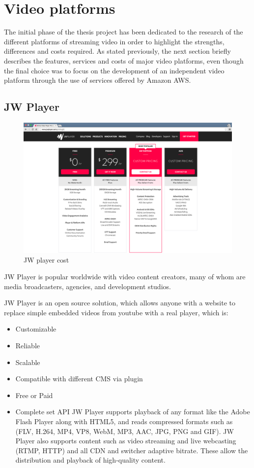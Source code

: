 \section{Video platforms}
\label{sec:Video platforms}

The initial phase of the thesis project has been dedicated to the research of the different platforms of streaming video in order to highlight the strengths, differences and costs required. As stated previously, the next section briefly describes the features, services and costs of major video platforms, even though the final choice was to focus on the development of an independent video platform through the use of services offered by Amazon AWS.
\newpage
\subsection{JW Player}
\label{sec:JW Player}

\begin{figure}[htb]
 \centering
 \includegraphics[width=1.0\linewidth]{images/chapter2/jwtPLayer.png}\hfill
 \caption[JW player cost]{JW player cost}
 \label{fig:fourV}
\end{figure}
JW Player is popular worldwide with video content creators, many of whom are media broadcasters, agencies, and development studios. 

JW Player is an open source solution, which allows anyone with a website to replace simple embedded videos from youtube with a real player, which is:

\begin{itemize}
\item Customizable
\item Reliable
\item Scalable
\item Compatible with different CMS via plugin
\item Free or Paid
\item Complete set API
JW Player supports playback of any format like the Adobe Flash Player along with HTML5, and reads compressed formats such as (FLV, H.264, MP4, VP8, WebM, MP3, AAC, JPG, PNG and GIF). JW Player also  supports content such as video streaming and live webcasting (RTMP, HTTP) and all CDN and switcher adaptive bitrate. These allow the distribution and playback of high-quality content.
\end{itemize}


